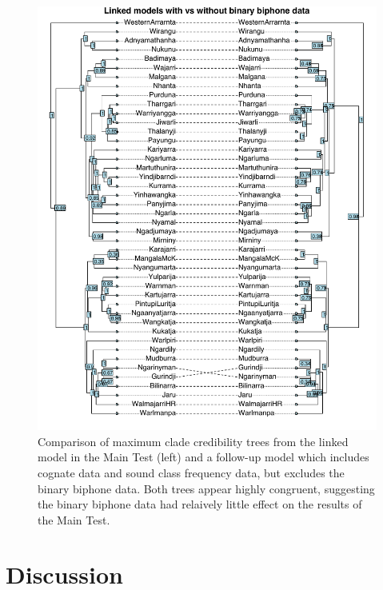 \begin{figure}
\centering
\includegraphics{06-tree-inference/fig/linked_all_vs_linked.pdf}
\caption[Maximum clade credibility trees from the linked model in the Main Test and a follow-up model]{\label{fig:linked-all-vs-linked}Comparison of maximum clade credibility trees from the linked model in the Main Test (left) and a follow-up model which includes cognate data and sound class frequency data, but excludes the binary biphone data. Both trees appear highly congruent, suggesting the binary biphone data had relaively little effect on the results of the Main Test.}
\end{figure}

\hypertarget{pn-tree-discussion}{%
\section{Discussion}\label{pn-tree-discussion}}

